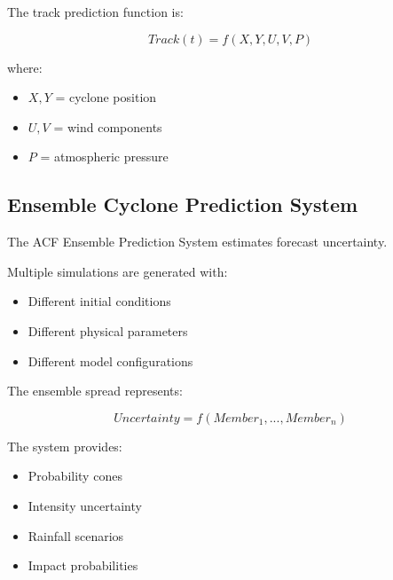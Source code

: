 The track prediction function is:

\[
Track(t)=f(X,Y,U,V,P)
\]


where:

\begin{itemize}

\item $X,Y$ = cyclone position

\item $U,V$ = wind components

\item $P$ = atmospheric pressure

\end{itemize}



\subsection{Ensemble Cyclone Prediction System}

The ACF Ensemble Prediction System estimates forecast uncertainty.

Multiple simulations are generated with:

\begin{itemize}

\item Different initial conditions

\item Different physical parameters

\item Different model configurations

\end{itemize}


The ensemble spread represents:

\[
Uncertainty=
f(Member_1,...,Member_n)
\]


The system provides:

\begin{itemize}

\item Probability cones

\item Intensity uncertainty

\item Rainfall scenarios

\item Impact probabilities

\end{itemize}


